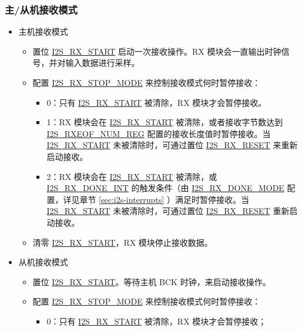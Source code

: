 \documentclass[main\_\_CN.tex]{subfiles}
\begin{document}
\subsubsection{主/从机接收模式} \label{sec:i2s-master-slave-rx-mode}
\begin{itemize}
    \item 主机接收模式
    \begin{itemize}
        \item 置位 \hyperref[fielddesc:I2SRXSTART]{I2S\_RX\_START} 启动一次接收操作。RX 模块会一直输出时钟信号，并对输入数据进行采样。
        \item 配置 \hyperref[fielddesc:I2SRXSTOPMODE]{I2S\_RX\_STOP\_MODE} 来控制接收模式何时暂停接收：
        \begin{itemize}
            \item 0：只有 \hyperref[fielddesc:I2SRXSTART]{I2S\_RX\_START} 被清除，RX 模块才会暂停接收。
            \item 1：RX 模块会在 \hyperref[fielddesc:I2SRXSTART]{I2S\_RX\_START} 被清除，或者接收字节数达到 \hyperref[regdesc:I2SRXEOFNUMREG]{I2S\_RXEOF\_NUM\_REG} 配置的接收长度值时暂停接收。当 \hyperref[fielddesc:I2SRXSTART]{I2S\_RX\_START} 未被清除时，可通过置位 \hyperref[fielddesc:I2SRXRESET]{I2S\_RX\_RESET} 来重新启动接收。
            \item 2：RX 模块会在 \hyperref[fielddesc:I2SRXSTART]{I2S\_RX\_START} 被清除，或 \hyperref[int:I2SRXDONEINT]{I2S\_RX\_DONE\_INT} 的触发条件（由 \hyperref[fielddesc:I2SRXDONEMODE]{I2S\_RX\_DONE\_MODE} 配置，详见章节 \ref{sec:i2s-interrupts} \textit{}）满足时暂停接收。当 \hyperref[fielddesc:I2SRXSTART]{I2S\_RX\_START} 未被清除时，可通过置位 \hyperref[fielddesc:I2SRXRESET]{I2S\_RX\_RESET} 重新启动接收。
        \end{itemize}
        \item 清零 \hyperref[fielddesc:I2SRXSTART]{I2S\_RX\_START}，RX 模块停止接收数据。
    \end{itemize}
    \item 从机接收模式
    \begin{itemize}
        \item 置位 \hyperref[fielddesc:I2SRXSTART]{I2S\_RX\_START}。等待主机 BCK 时钟，来启动接收操作。
        \item 配置 \hyperref[fielddesc:I2SRXSTOPMODE]{I2S\_RX\_STOP\_MODE} 来控制接收模式何时暂停接收：
        \begin{itemize}
            \item 0：只有 \hyperref[fielddesc:I2SRXSTART]{I2S\_RX\_START} 被清除，RX 模块才会暂停接收；

\end{itemize}
\end{itemize}
\end{itemize}
\end{document}
